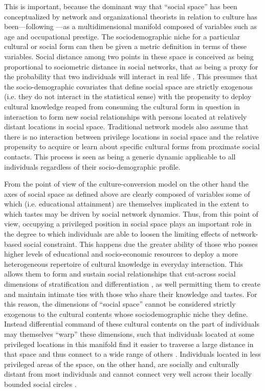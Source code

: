 This is important, because the dominant way that ``social space'' has been conceptualized by network and organizational theorists \citep{hannan_etal03, mcpherson04} in relation to culture has been---following \citet{blau77a}---as a multidimensional manifold composed of variables such as age and occupational prestige.  The sociodemographic niche for a particular cultural or social form can then be given a metric definition in terms of these variables.  Social distance among two points in these space is conceived as being proportional to sociometric distance in social networks, that as being a proxy for the probability that two individuals will interact in real life \citep{mark98a}.  This presumes that the socio-demographic covariates that define social space are strictly exogenous (i.e. they do not interact in the statistical sense) with the propensity to deploy cultural knowledge reaped from consuming the cultural form in question in interaction to form new social relationships with persons located at relatively distant locations in social space.   Traditional network models also assume that there is no interaction between privilege locations in social space and the relative propensity to acquire or learn about specific cultural forms from proximate social contacts.  This process is seen as being a generic dynamic applicable to all individuals regardless of their socio-demographic profile.  

From the point of view of the culture-conversion model on the other hand the axes of social space as defined above are clearly composed of variables some of which (i.e. educational attainment) are themselves implicated in the extent to which tastes may be driven by social network dynamics.  Thus, from this point of view, occupying a privileged position in social space plays an important role in the degree to which individuals are able to loosen the limiting effects of network-based social constraint. This happens due the greater ability of those who posses higher levels of educational and socio-economic resources to deploy a more heterogeneous repertoire of cultural knowledge in everyday interaction.   This allows them to form and sustain social relationships that cut-across social dimensions of stratification and differentiation \citep{dimaggio87}, as well permitting them to create and maintain intimate ties with those who share their knowledge and tastes.  For this reason, the dimensions of ``social space'' cannot be considered strictly exogenous to the cultural contents whose sociodemographic niche they define.  Instead differential command of these cultural contents on the part of individuals may themselves ``warp'' these dimensions, such that individuals located at some privileged locations in this manifold find it easier to traverse a large distance in that space and thus connect to a wide range of others \citep{erickson96, lin_dumin86}. Individuals located in less privileged areas of the space, on the other hand, are socially and culturally distant from most individuals and cannot connect very well across their locally bounded social circles \citep{bryson97}. 

